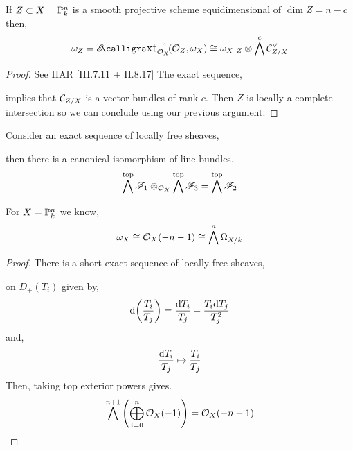 \documentclass[12pt]{article}
\begin{document}
\begin{theorem}
If $Z \subset X = \P^n_k$ is a smooth projective scheme equidimensional of $\dim{Z} = n - c$ then,
\[ \omega_Z = \shExt{c}{\struct{X}}{\struct{Z}}{\omega_X} \cong \omega_X |_Z \otimes \bigwedge^c \C^\vee_{Z/X} \]
\end{theorem}

\begin{proof}
See HAR [III.7.11 + II.8.17]
The exact sequence,
\begin{center}
\end{center}
implies that $\C_{Z/X}$ is a vector bundles of rank $c$. Then $Z$ is locally a complete intersection so we can conclude using our previous argument.
\end{proof}

\begin{lemma}
Consider an exact sequence of locally free sheaves,
\begin{center}
\end{center}
then there is a canonical isomorphism of line bundles,
\[ \bigwedge^{\text{top}} \F_1 \otimes_{\struct{X}} \bigwedge^{\text{top}} \F_3 = \bigwedge^{\text{top}} \F_2 \]
\end{lemma}

\begin{prop}
For $X = \P^n_k$ we know,
\[ \omega_X \cong \struct{X}(-n-1) \cong \bigwedge^n \Omega_{X/k} \]
\end{prop}

\begin{proof}
There is a short exact sequence of locally free sheaves,
\begin{center}
\end{center}
on $D_+(T_i)$ given by,
\[ \d{ \left( \frac{T_i}{T_j} \right) } = \frac{\d{T_i}}{T_j} - \frac{T_i \d{T_j}}{T_j^2} \]
and,
\[ \frac{\d{T_i}}{T_j} \mapsto \frac{T_i}{T_j} \]
Then, taking top exterior powers gives.
\[ \bigwedge^{n+1} \left( \bigoplus_{i = 0}^n \struct{X}(-1) \right) = \struct{X}(-n - 1) \]
\end{proof}
\end{document}
